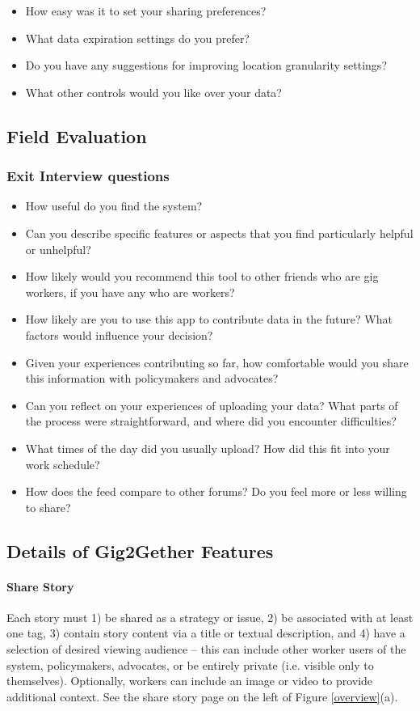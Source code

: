 \begin{itemize}
    \item How easy was it to set your sharing preferences?
    \item What data expiration settings do you prefer?
    \item Do you have any suggestions for improving location granularity settings?
    \item What other controls would you like over your data?
\end{itemize}

\subsection{Field Evaluation}
\subsubsection{Exit Interview questions}\label{exits}
\begin{itemize}
    \item How useful do you find the system? 
    \item Can you describe specific features or aspects that you find particularly helpful or unhelpful?
    \item How likely would you recommend this tool to other friends who are gig workers, if you have any who are workers?
    \item How likely are you to use this app to contribute data in the future? What factors would influence your decision?
    \item Given your experiences contributing so far, how comfortable would you share this information with policymakers and advocates?
    \item Can you reflect on your experiences of uploading your data? What parts of the process were straightforward, and where did you encounter difficulties?
    \item What times of the day did you usually upload? How did this fit into your work schedule?
    \item How does the feed compare to other forums? Do you feel more or less willing to share?
\end{itemize}

\subsection{Details of Gig2Gether Features}
\label{details}
\paragraph{Share Story} \label{share_story}
Each story must 1) be shared as a strategy or issue, 2) be associated with at least one tag, 3) contain story content via a title or textual description, and 4) have a selection of desired viewing audience -- this can include other worker users of the system, policymakers, advocates, or be entirely private (i.e. visible only to themselves). Optionally, workers can include an image or video to provide additional context. See the share story page on the left of Figure \ref{overview}(a).

